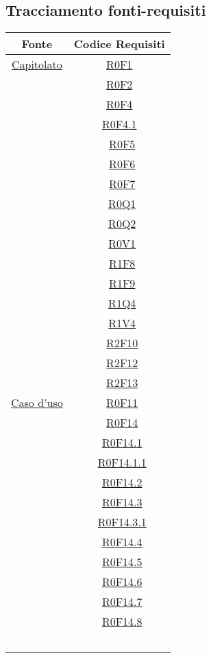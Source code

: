 \documentclass[../AnalisiDeiRequisiti.tex]{subfiles}
\begin{document}
\subsection{Tracciamento fonti-requisiti}
\normalsize
\begin{longtable}{|c|c|}
	\hline
	\textbf{Fonte} & \textbf{Codice Requisiti} \\
	\hline
	\endhead
	\hyperlink{Capitolato}{Capitolato} & \hyperlink{R0F1}{R0F1}\\& \hyperlink{R0F2}{R0F2}\\&
	\hyperlink{R0F4}{R0F4}\\&
	\hyperlink{R0F4.1}{R0F4.1}\\& \
	\hyperlink{R0F5}{R0F5}\\& \
	\hyperlink{R0F6}{R0F6}\\& \
	\hyperlink{R0F7}{R0F7}\\& \
	\hyperlink{R0Q1}{R0Q1}\\& \
	\hyperlink{R0Q2}{R0Q2}\\& \
	\hyperlink{R0V1}{R0V1}\\& \
	\hyperlink{R1F8}{R1F8}\\& \
	\hyperlink{R1F9}{R1F9}\\& \
	\hyperlink{R1Q4}{R1Q4}\\& \
	\hyperlink{R1V4}{R1V4}\\& \
	\hyperlink{R2F10}{R2F10}\\& \
	\hyperlink{R2F12}{R2F12}\\& \
	\hyperlink{R2F13}{R2F13}\\\hline
	\hyperlink{Caso d'uso}{Caso d'uso} & \
	\hyperlink{R0F11}{R0F11}\\& \
	\hyperlink{R0F14}{R0F14}\\& \
	\hyperlink{R0F14.1}{R0F14.1}\\& \
	\hyperlink{R0F14.1.1}{R0F14.1.1}\\& \
	\hyperlink{R0F14.2}{R0F14.2}\\& \
	\hyperlink{R0F14.3}{R0F14.3}\\& \
	\hyperlink{R0F14.3.1}{R0F14.3.1}\\& \
	\hyperlink{R0F14.4}{R0F14.4}\\& \
	\hyperlink{R0F14.5}{R0F14.5}\\& \
	\hyperlink{R0F14.6}{R0F14.6}\\& \
	\hyperlink{R0F14.7}{R0F14.7}\\& \
	\hyperlink{R0F14.8}{R0F14.8}\\& \

\end{longtable}
\end{document}
